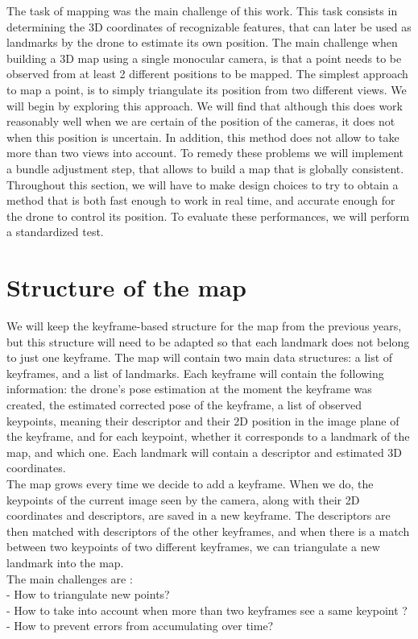 
The task of mapping was the main challenge of this work. This task consists in determining the 3D coordinates of recognizable features, that can later be used as landmarks by the drone to estimate its own position. The main challenge when building a 3D map using a single monocular camera, is that a point needs to be observed from at least 2 different positions to be mapped. The simplest approach to map a point, is to simply triangulate its position from two different views. We will begin by exploring this approach. We will find that although this does work reasonably well when we are certain of the position of the cameras, it does not when this position is uncertain. In addition, this method does not allow to take more than two views into account. To remedy these problems we will implement a bundle adjustment step, that allows to build a map that is globally consistent. Throughout this section, we will have to make design choices to try to obtain a method that is both fast enough to work in real time, and accurate enough for the drone to control its position. To evaluate these performances, we will perform a standardized test.

\section{Structure of the map}
We will keep the keyframe-based structure for the map from the previous years, but this structure will need to be adapted so that each landmark does not belong to just one keyframe. The map will contain two main data structures: a list of keyframes, and a list of landmarks. Each keyframe will contain the following information: the drone's pose estimation at the moment the keyframe was created, the estimated corrected pose of the keyframe, a list of observed keypoints, meaning their descriptor and their 2D position in the image plane of the keyframe, and for each keypoint, whether it corresponds to a landmark of the map, and which one. Each landmark will contain a descriptor and estimated 3D coordinates.\\
The map grows every time we decide to add a keyframe. When we do, the keypoints of the current image seen by the camera, along with their 2D coordinates and descriptors, are saved in a new keyframe. The descriptors are then matched with descriptors of the other keyframes, and when there is a match between two keypoints of two different keyframes, we can triangulate a new landmark into the map.\\
The main challenges are :\\
- How to triangulate new points?\\
- How to take into account when more than two keyframes see a same keypoint ?\\
- How to prevent errors from accumulating over time?\\

